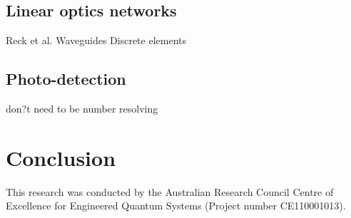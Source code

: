 \documentclass[aps,pra,twocolumn,amsmath,amssymb,nofootinbib,superscriptaddress]{revtex4}
\begin{document}
\subsection{Linear optics networks}
Reck et al.
Waveguides
Discrete elements

\subsection{Photo-detection}
don?t need to be number resolving

\section{Conclusion}

%
%

\begin{acknowledgments}
This research was conducted by the Australian Research Council Centre of Excellence for Engineered Quantum Systems (Project number CE110001013).
\end{acknowledgments}

%
%


\end{document}
